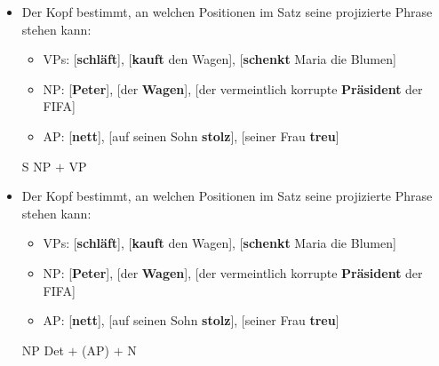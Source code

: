 \begin{frame}

\begin{itemize}
	\item Der Kopf bestimmt, an welchen Positionen im Satz seine projizierte Phrase stehen kann:
	\begin{itemize}
		\item VPs: [\textbf{schläft}], [\textbf{kauft} den Wagen], [\textbf{schenkt} Maria die Blumen]
		\item NP: [\textbf{Peter}], [der \textbf{Wagen}], [der vermeintlich korrupte \textbf{Präsident} der FIFA]
		\item AP: [\textbf{nett}], [auf seinen Sohn \textbf{stolz}], [seiner Frau \textbf{treu}]
\end{itemize}
	\pause

\ea S \ras NP $+$ VP

\z

\z	
	
\end{itemize}

\end{frame}


\begin{frame}

\begin{itemize}
	\item Der Kopf bestimmt, an welchen Positionen im Satz seine projizierte Phrase stehen kann:
	\begin{itemize}
		\item VPs: [\textbf{schläft}], [\textbf{kauft} den Wagen], [\textbf{schenkt} Maria die Blumen]
		\item NP: [\textbf{Peter}], [der \textbf{Wagen}], [der vermeintlich korrupte \textbf{Präsident} der FIFA]
		\item AP: [\textbf{nett}], [auf seinen Sohn \textbf{stolz}], [seiner Frau \textbf{treu}]
\end{itemize}
	\pause

\ea NP \ras Det $+$ (AP) $+$ N

\z
	
\z	

\end{itemize}

\end{frame}

